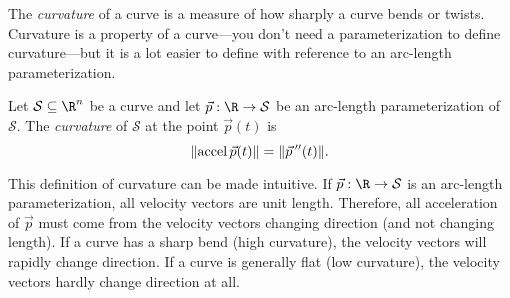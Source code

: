 The \emph{curvature} of a curve is a measure of how sharply a curve bends or
twists.  Curvature is a property of a curve---you don't need a parameterization to define
curvature---but it is a lot easier to define with reference to an arc-length parameterization.

\begin{definition}[Curvature]
	Let $\mathcal S\subseteq\R^n$ be a curve and let $\vec p:\R\to\mathcal S$ be an arc-length
	parameterization of $\mathcal S$.  The \emph{curvature} of $\mathcal S$ at the point
	$\vec p(t)$ is 
	\[
		\lVert\operatorname{accel} \vec p(t)\rVert = \lVert\vec p\,''(t)\rVert.
	\]
\end{definition}

This definition of curvature can be made intuitive.  If $\vec p:\R\to\mathcal S$ is an arc-length parameterization,
all velocity vectors are unit length.  Therefore, all acceleration of $\vec p$ must come from
the velocity vectors changing direction (and not changing length).  If a curve has a sharp bend (high curvature),
the velocity vectors will rapidly change direction.  If a curve is generally flat (low curvature),
the velocity vectors hardly change direction at all.


